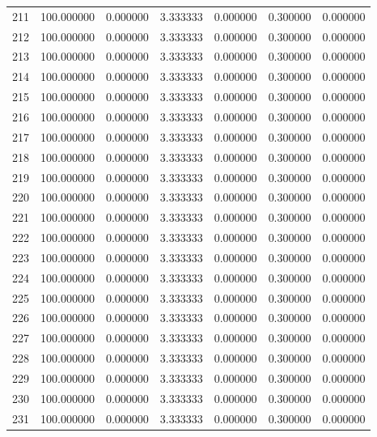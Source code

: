 \begin{tabular}{rrrrrrr}
211 & 100.000000 &    0.000000 &  3.333333 &   0.000000 &   0.300000 &  0.000000 \\
212 & 100.000000 &    0.000000 &  3.333333 &   0.000000 &   0.300000 &  0.000000 \\
213 & 100.000000 &    0.000000 &  3.333333 &   0.000000 &   0.300000 &  0.000000 \\
214 & 100.000000 &    0.000000 &  3.333333 &   0.000000 &   0.300000 &  0.000000 \\
215 & 100.000000 &    0.000000 &  3.333333 &   0.000000 &   0.300000 &  0.000000 \\
216 & 100.000000 &    0.000000 &  3.333333 &   0.000000 &   0.300000 &  0.000000 \\
217 & 100.000000 &    0.000000 &  3.333333 &   0.000000 &   0.300000 &  0.000000 \\
218 & 100.000000 &    0.000000 &  3.333333 &   0.000000 &   0.300000 &  0.000000 \\
219 & 100.000000 &    0.000000 &  3.333333 &   0.000000 &   0.300000 &  0.000000 \\
220 & 100.000000 &    0.000000 &  3.333333 &   0.000000 &   0.300000 &  0.000000 \\
221 & 100.000000 &    0.000000 &  3.333333 &   0.000000 &   0.300000 &  0.000000 \\
222 & 100.000000 &    0.000000 &  3.333333 &   0.000000 &   0.300000 &  0.000000 \\
223 & 100.000000 &    0.000000 &  3.333333 &   0.000000 &   0.300000 &  0.000000 \\
224 & 100.000000 &    0.000000 &  3.333333 &   0.000000 &   0.300000 &  0.000000 \\
225 & 100.000000 &    0.000000 &  3.333333 &   0.000000 &   0.300000 &  0.000000 \\
226 & 100.000000 &    0.000000 &  3.333333 &   0.000000 &   0.300000 &  0.000000 \\
227 & 100.000000 &    0.000000 &  3.333333 &   0.000000 &   0.300000 &  0.000000 \\
228 & 100.000000 &    0.000000 &  3.333333 &   0.000000 &   0.300000 &  0.000000 \\
229 & 100.000000 &    0.000000 &  3.333333 &   0.000000 &   0.300000 &  0.000000 \\
230 & 100.000000 &    0.000000 &  3.333333 &   0.000000 &   0.300000 &  0.000000 \\
231 & 100.000000 &    0.000000 &  3.333333 &   0.000000 &   0.300000 &  0.000000 \\

\end{tabular}
